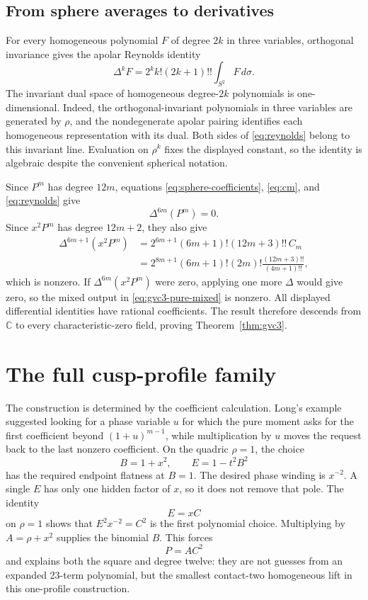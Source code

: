 \documentclass[11pt]{article}
\begin{document}
\subsection{From sphere averages to derivatives}

For every homogeneous polynomial $F$ of degree $2k$ in three variables,
orthogonal invariance gives the apolar Reynolds identity
\begin{equation}\label{eq:reynolds}
 \Delta^kF
 =2^kk!(2k+1)!!\int_{S^2}F\,d\sigma.
\end{equation}
The invariant dual space of homogeneous degree-$2k$ polynomials is
one-dimensional.  Indeed, the orthogonal-invariant polynomials in three
variables are generated by $\rho$, and the nondegenerate apolar pairing
identifies each homogeneous representation with its dual.  Both sides of
\eqref{eq:reynolds} belong to this invariant line.  Evaluation on $\rho^k$
fixes the displayed constant, so the identity is algebraic despite the
convenient spherical notation.

Since $P^m$ has degree $12m$, equations
\eqref{eq:sphere-coefficients}, \eqref{eq:cm}, and
\eqref{eq:reynolds} give
\[
 \Delta^{6m}(P^m)=0.
\]
Since $x^2P^m$ has degree $12m+2$, they also give
\begin{align*}
 \Delta^{6m+1}(x^2P^m)
 &=2^{6m+1}(6m+1)!(12m+3)!!\,C_m\\
 &=2^{8m+1}(6m+1)!(2m)!
   \frac{(12m+3)!!}{(4m+1)!!},
\end{align*}
which is nonzero.  If $\Delta^{6m}(x^2P^m)$ were zero, applying one more
$\Delta$ would give zero, so the mixed output in
\eqref{eq:gvc3-pure-mixed} is nonzero.  All displayed differential
identities have rational coefficients.  The result therefore descends from
$\mathbb C$ to every characteristic-zero field, proving
Theorem~\ref{thm:gvc3}.

\section{The full cusp-profile family}

The construction is determined by the coefficient calculation.
Long's example suggested looking for a phase variable $u$ for which the
pure moment asks for the first coefficient beyond
$(1+u)^{m-1}$, while multiplication by $u$ moves the request back to the
last nonzero coefficient.  On the quadric $\rho=1$, the choice
\[
 B=1+x^2,
 \qquad E=1-t^2B^2
\]
has the required endpoint flatness at $B=1$.  The desired phase winding is
$x^{-2}$.  A single $E$ has only one hidden factor of $x$, so it does not
remove that pole.  The identity
\[
 E=xC
\]
on $\rho=1$ shows that $E^2x^{-2}=C^2$ is the first polynomial choice.
Multiplying by $A=\rho+x^2$ supplies the binomial $B$.  This forces
\[
 P=AC^2
\]
and explains both the square and degree twelve: they are not guesses from
an expanded 23-term polynomial, but the smallest contact-two homogeneous
lift in this one-profile construction.
\end{document}
